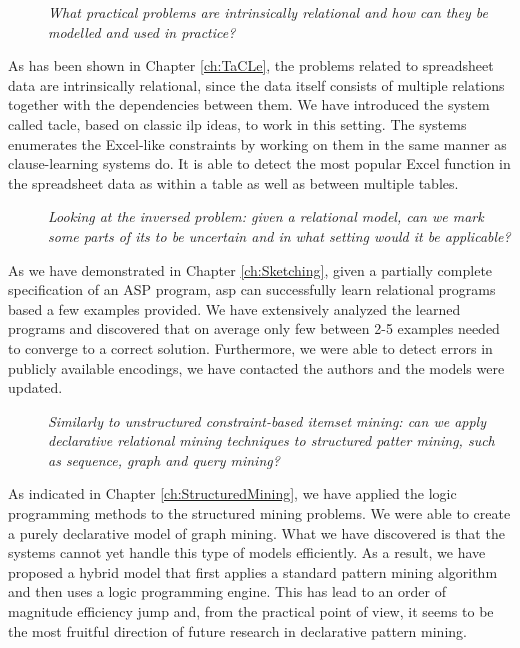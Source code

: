 \begin{description}
\item[\ctwo] \textit{What practical problems are intrinsically relational and
  how can they be modelled and used in practice?}
\end{description}

As has been shown in Chapter \ref{ch:TaCLe}, the problems related to
spreadsheet data are intrinsically relational, since the data itself
consists of multiple relations together with the dependencies between
them. We have introduced the system called \acrlong{tacle}, based on
classic \acrshort{ilp} ideas, to work in this setting. The systems
enumerates the Excel-like constraints by working on them in the same
manner as clause-learning systems do. It is able to detect the most
popular Excel function in the spreadsheet data as within a table as
well as between multiple tables.

\begin{description}
\item[\cthree] \textit{Looking at the inversed problem: given a relational
    model, can we mark some parts of its to be uncertain and in what
  setting would it be applicable?}
\end{description}

As we have demonstrated in Chapter \ref{ch:Sketching}, given a
partially complete specification of an ASP program, \acrshort{asp}
can successfully learn relational programs based a few examples
provided. We have extensively analyzed the learned programs and
discovered that on average only few between 2-5 examples needed to
converge to a correct solution. Furthermore, we were able to detect
errors in publicly available encodings, we have contacted the authors
and the models were updated.


\begin{description}
\item[\cfour]  \textit{Similarly to unstructured constraint-based itemset
    mining: can we apply declarative relational mining
    techniques to structured patter mining, such as sequence, graph
  and query mining?}
\end{description}

As indicated in Chapter \ref{ch:StructuredMining}, we have applied the
logic programming methods to the structured mining problems. We were
able to create a purely declarative model of graph mining. What we
have discovered is that the systems cannot yet handle this type of
models efficiently. As a result, we have proposed a hybrid model that
first applies a standard pattern mining algorithm and then uses a
logic programming engine. This has lead to an order of magnitude
efficiency jump and, from the practical point of view, it seems to be
the most fruitful direction of future research in declarative pattern
mining.



\cleardoublepage


